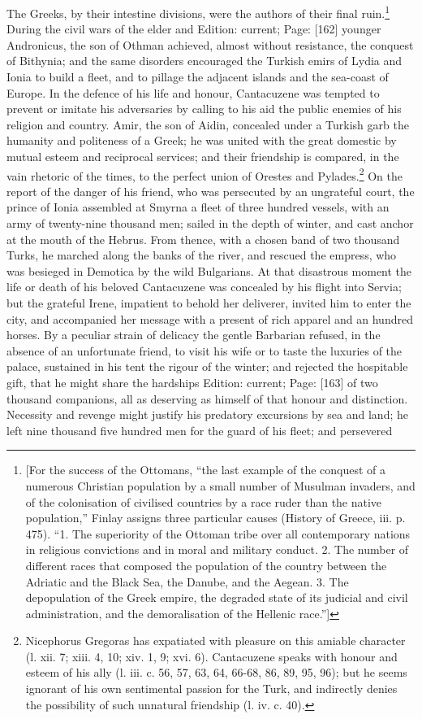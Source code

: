 The Greeks, by their intestine divisions, were the authors of their final ruin.\footnote{[For the success of the Ottomans, \texthebrew{“}the last example of the conquest of a numerous Christian population by a small number of Musulman invaders, and of the colonisation of civilised countries by a race ruder than the native population,\texthebrew{}” Finlay assigns three particular causes (History of Greece, iii. p. 475). \texthebrew{“}1. The superiority of the Ottoman tribe over all contemporary nations in religious convictions and in moral and military conduct. 2. The number of different races that composed the population of the country between the Adriatic and the Black Sea, the Danube, and the Aegean. 3. The depopulation of the Greek empire, the degraded state of its judicial and civil administration, and the demoralisation of the Hellenic race.\texthebrew{}”]} During the civil wars of the elder and Edition: current; Page: [162] younger Andronicus, the son of Othman achieved, almost without resistance, the conquest of Bithynia; and the same disorders encouraged the Turkish emirs of Lydia and Ionia to build a fleet, and to pillage the adjacent islands and the sea-coast of Europe. In the defence of his life and honour, Cantacuzene was tempted to prevent or imitate his adversaries by calling to his aid the public enemies of his religion and country. Amir, the son of Aidin, concealed under a Turkish garb the humanity and politeness of a Greek; he was united with the great domestic by mutual esteem and reciprocal services; and their friendship is compared, in the vain rhetoric of the times, to the perfect union of Orestes and Pylades.\footnote{Nicephorus Gregoras has expatiated with pleasure on this amiable character (l. xii. 7; xiii. 4, 10; xiv. 1, 9; xvi. 6). Cantacuzene speaks with honour and esteem of his ally (l. iii. c. 56, 57, 63, 64, 66-68, 86, 89, 95, 96); but he seems ignorant of his own sentimental passion for the Turk, and indirectly denies the possibility of such unnatural friendship (l. iv. c. 40).} On the report of the danger of his friend, who was persecuted by an ungrateful court, the prince of Ionia assembled at Smyrna a fleet of three hundred vessels, with an army of twenty-nine thousand men; sailed in the depth of winter, and cast anchor at the mouth of the Hebrus. From thence, with a chosen band of two thousand Turks, he marched along the banks of the river, and rescued the empress, who was besieged in Demotica by the wild Bulgarians. At that disastrous moment the life or death of his beloved Cantacuzene was concealed by his flight into Servia; but the grateful Irene, impatient to behold her deliverer, invited him to enter the city, and accompanied her message with a present of rich apparel and an hundred horses. By a peculiar strain of delicacy the gentle Barbarian refused, in the absence of an unfortunate friend, to visit his wife or to taste the luxuries of the palace, sustained in his tent the rigour of the winter; and rejected the hospitable gift, that he might share the hardships Edition: current; Page: [163] of two thousand companions, all as deserving as himself of that honour and distinction. Necessity and revenge might justify his predatory excursions by sea and land; he left nine thousand five hundred men for the guard of his fleet; and persevered 